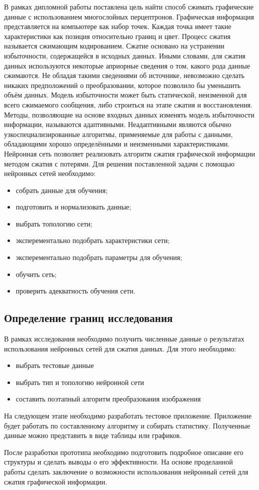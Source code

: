 В рамках дипломной работы поставлена цель найти способ сжимать графические данные с использованием многослойных перцептронов.
Графическая информация представляется на компьютере как набор точек.
Каждая точка имеет такие характеристики как позиция относительно границ и цвет.
Процесс сжатия называется сжимающим кодированием. Сжатие основано на устранении избыточности, содержащейся в исходных данных.
Иными словами, для сжатия данных используются некоторые априорные сведения о том, какого рода данные сжимаются.
Не обладая такими сведениями об источнике, невозможно сделать никаких предположений о преобразовании, которое позволило бы уменьшить объём данных.
Модель избыточности может быть статической, неизменной для всего сжимаемого сообщения, либо строиться на этапе сжатия и восстановления.
Методы, позволяющие на основе входных данных изменять модель избыточности информации, называются адаптивными.
Неадаптивными являются обычно узкоспециализированные алгоритмы, применяемые для работы с данными, обладающими хорошо определёнными и неизменными характеристиками.
Нейронная сеть позволяет реализовать алгоритм сжатия графической информации методом сжатия с потерями.
Для решения поставленной задачи с помощью нейронных сетей необходимо:
\begin{itemize}
  \item собрать данные для обучения;
  \item подготовить и нормализовать данные;
  \item выбрать топологию сети;
  \item	эксперементально подобрать характеристики сети;
  \item	эксперементально подобрать параметры для обучения;
  \item	обучить сеть;
  \item	проверить адекватность обучения сети.
\end{itemize}

\subsection{Определение границ исследования}
\label{sub:practice:task_milestone}

В рамках исследования необходимо получить численные данные о результатах использования нейронных сетей для сжатия данных.
Для этого необходимо:
\begin{itemize}
  \item выбрать тестовые данные
  \item выбрать тип и топологию нейронной сети
  \item составить поэтапный алгоритм преобразования изображения
\end{itemize}

На следующем этапе необходимо разработать тестовое приложение.
Приложение будет работать по составленному алгоритму и собирать статистику.
Полученные данные можно представить в виде таблицы или графиков.

После разработки прототипа необходимо подготовить подробное описание его структуры и сделать выводы о его эффективности.
На основе проделанной работы сделать заключение о возможности использования нейронный сетей для сжатия графической информации.
